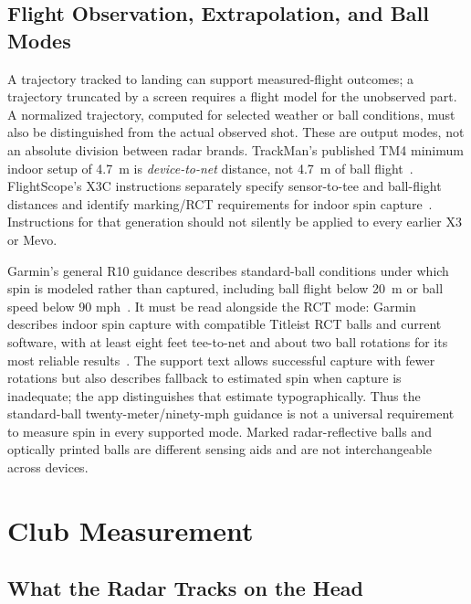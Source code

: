 \subsection{Flight Observation, Extrapolation, and Ball Modes}

A trajectory tracked to landing can support measured-flight outcomes; a trajectory truncated by a screen requires a flight model for the unobserved part.
A normalized trajectory, computed for selected weather or ball conditions, must also be distinguished from the actual observed shot.
These are output modes, not an absolute division between radar brands.
TrackMan's published TM4 minimum indoor setup of \SI{4.7}{\meter} is \emph{device-to-net} distance, not \SI{4.7}{\meter} of ball flight~\cite{trackmanspecs}.
FlightScope's X3C instructions separately specify sensor-to-tee and ball-flight distances and identify marking/RCT requirements for indoor spin capture~\cite{flightscopex3csetup}.
Instructions for that generation should not silently be applied to every earlier X3 or Mevo.

Garmin's general R10 guidance describes standard-ball conditions under which spin is modeled rather than captured, including ball flight below \SI{20}{\meter} or ball speed below 90 mph~\cite{garminr10support}.
It must be read alongside the RCT mode: Garmin describes indoor spin capture with compatible Titleist RCT balls and current software, with at least eight feet tee-to-net and about two ball rotations for its most reliable results~\cite{garminr10rct}.
The support text allows successful capture with fewer rotations but also describes fallback to estimated spin when capture is inadequate; the app distinguishes that estimate typographically.
Thus the standard-ball twenty-meter/ninety-mph guidance is not a universal requirement to measure spin in every supported mode.
Marked radar-reflective balls and optically printed balls are different sensing aids and are not interchangeable across devices.

\section{Club Measurement}
\label{sec:radarclub}

\subsection{What the Radar Tracks on the Head}

